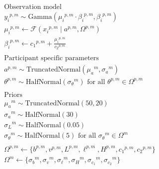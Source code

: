 \documentclass[a4paper,12pt]{article}
\begin{document}
\begin{align*}
    &\text{Observation model} \\
    &{y_i}^{p,m}\sim \text{Gamma}\left({\mu_i}^{p,m}\cdot{\beta_i}^{p,m}, {\beta_i}^{p,m}\right) \\
    &{\mu_i}^{p,m} \gets \mathcal{F}\left({x_i}^{p,m} \mid a^{p,m}, {\Omega}^{p,m}\right) \\
    &{\beta_i}^{p,m} \gets {c_1}^{p,m} + \frac{{\mu_i}^{p,m}}{{c_2}^{p,m}}\\\\
    &\text{Participant specific parameters} \\
    &a^{p,m} \sim \text{TruncatedNormal}\left({\mu_a}^{m}, {\sigma_a}^{m}\right)\\
    &{\theta}^{p,m} \sim \text{HalfNormal}\left({\sigma_{\theta}}^{m}\right) \text{ for all } \theta^{p,m} \in {\Omega}^{p,m}\\\\
    &\text{Priors} \\
    & {\mu_a}^m \sim \text{TruncatedNormal}\left(50, 20\right)\\
    &{\sigma_a}^m \sim \text{HalfNormal}\left(30\right)\\
    &{\sigma_L}^{m} \sim \text{HalfNormal}\left(0.05\right)\\
    &{\sigma_\theta}^m \sim \text{HalfNormal}\left(5\right) \text{ for all } {\sigma_\theta}^m\in \Omega^m\\\\
    &{\Omega}^{p,m} \gets \{{b}^{p,m}, {v}^{p,m}, {L}^{p,m}, {\ell}^{p,m}, {H}^{p,m}, {c_1}^{p,m}, {c_2}^{p,m}\}\\
    &\Omega^m \gets \{{\sigma_{b}}^m, {\sigma_{v}}^m,  {\sigma_{\ell}}^m, {\sigma_{H}}^m, {\sigma_{c_1}}^m, {\sigma_{c_2}}^m\}
\end{align*}
\end{document}
